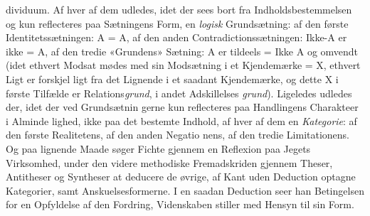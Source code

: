 \documentclass[12pt,a4paper]{book}
\begin{document}
dividuum. Af hver af dem udledes, idet der sees bort fra
Indholdsbestemmelsen og kun reflecteres paa Sætningens Form,
en \emph{logisk} Grundsætning: af den første Identitetssætningen:
A = A, af den anden Contradictionssætningen: Ikke-A er
ikke = A, af den tredie «Grundens» Sætning: A er tildeels
= Ikke A og omvendt (idet ethvert Modsat mødes med sin
Modsætning i et Kjendemærke = X, ethvert Ligt er forskjel\-%
ligt fra det Lignende i et saadant Kjendemærke, og dette X
i første Tilfælde er Relations\emph{grund}, i andet Adskillelses\-%
\emph{grund}). Ligeledes udledes der, idet der ved Grundsætnin\-%
gerne kun reflecteres paa Handlingens Charakteer i Alminde\-%
lighed, ikke paa det bestemte Indhold, af hver af dem en
\emph{Kategorie}: af den første Realitetens, af den anden Negatio\-%
nens, af den tredie Limitationens. Og paa lignende Maade
søger Fichte gjennem en Reflexion paa Jegets Virksomhed,
under den videre methodiske Fremadskriden gjennem Theser,
Antitheser og Syntheser at deducere de øvrige, af Kant uden
Deduction optagne Kategorier, samt Anskuelsesformerne. I en
saadan Deduction seer han Betingelsen for en Opfyldelse af
den Fordring, Videnskaben stiller med Hensyn til sin Form.
\end{document}
